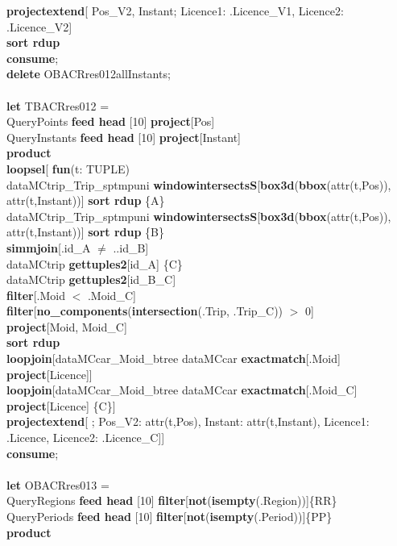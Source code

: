 \documentclass[a4paper]{article}
\newcommand{\op}[1]{\textbf{#1}}
\begin{document}
\begin{scriptsize}
\begin{tabbing}
\>\op{projectextend}[ Pos\_V2, Instant; Licence1: .Licence\_V1, Licence2: .Licence\_V2]\\
\>\op{sort rdup}\\
\op{consume};\\
\op{delete} OBACRres012allInstants;\\
\\
\op{let} TBACRres012 =\\
\>QueryPoints \op{feed head} [10] \op{project}[Pos]\\
\>QueryInstants \op{feed head} [10] \op{project}[Instant]\\
\>\op{product}\\
\>\op{loopsel}[ \op{fun}(t: TUPLE)\\
\>\>dataMCtrip\_Trip\_sptmpuni \op{windowintersectsS}[\op{box3d}(\op{bbox}(attr(t,Pos)), attr(t,Instant))] \op{sort rdup} \{A\}\\
\>\>dataMCtrip\_Trip\_sptmpuni \op{windowintersectsS}[\op{box3d}(\op{bbox}(attr(t,Pos)), attr(t,Instant))] \op{sort rdup} \{B\}\\
\>\>\op{simmjoin}[.id\_A $\neq$ ..id\_B]\\
\>\>dataMCtrip \op{gettuples2}[id\_A] \{C\}\\
\>\>dataMCtrip \op{gettuples2}[id\_B\_C]\\
\>\>\op{filter}[.Moid $<$ .Moid\_C]\\
\>\>\op{filter}[\op{no\_components}(\op{intersection}(.Trip, .Trip\_C)) $>$ 0]\\
\>\>\op{project}[Moid, Moid\_C]\\
\>\>\op{sort rdup}\\
\>\>\op{loopjoin}[dataMCcar\_Moid\_btree dataMCcar \op{exactmatch}[.Moid] \op{project}[Licence]]\\
\>\>\op{loopjoin}[dataMCcar\_Moid\_btree dataMCcar \op{exactmatch}[.Moid\_C] \op{project}[Licence] \{C\}]\\
\>\>\op{projectextend}[ ; Pos\_V2: attr(t,Pos), Instant: attr(t,Instant), Licence1: .Licence, Licence2: .Licence\_C]]\\
\op{consume};\\
\\
\op{let} OBACRres013 =\\
\>QueryRegions \op{feed head} [10] \op{filter}[\op{not}(\op{isempty}(.Region))]\{RR\}\\
\>QueryPeriods \op{feed head} [10] \op{filter}[\op{not}(\op{isempty}(.Period))]\{PP\}\\
\>\op{product}\\

\end{tabbing}
\end{scriptsize}
\end{document}

